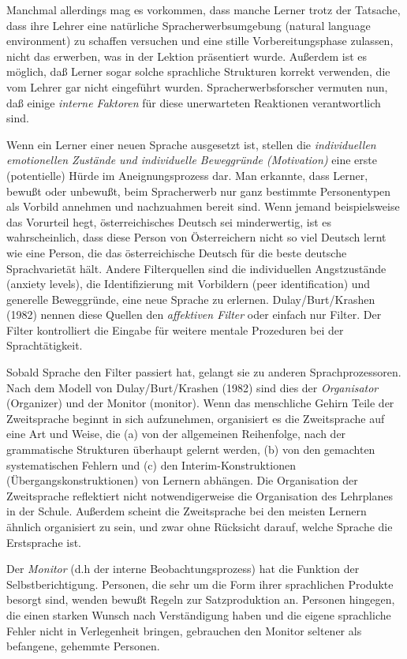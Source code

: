 \documentclass[
  letterpaper,
]{scrbook}
\begin{document}
Manchmal allerdings mag es vorkommen, dass manche Lerner trotz der
Tatsache, dass ihre Lehrer eine natürliche Spracherwerbsumgebung
(natural language environment) zu schaffen versuchen und eine stille
Vorbereitungsphase zulassen, nicht das erwerben, was in der Lektion
präsentiert wurde. Außerdem ist es möglich, daß Lerner sogar solche
sprachliche Strukturen korrekt verwenden, die vom Lehrer gar nicht
eingeführt wurden. Spracherwerbsforscher vermuten nun, daß einige
\emph{interne Faktoren} für diese unerwarteten Reaktionen verantwortlich
sind.

Wenn ein Lerner einer neuen Sprache ausgesetzt ist, stellen die
\emph{individuellen emotionellen Zustände und individuelle Beweggründe
(Motivation)} eine erste (potentielle) Hürde im Aneignungsprozess dar.
Man erkannte, dass Lerner, bewußt oder unbewußt, beim Spracherwerb nur
ganz bestimmte Personentypen als Vorbild annehmen und nachzuahmen bereit
sind. Wenn jemand beispielsweise das Vorurteil hegt, österreichisches
Deutsch sei minderwertig, ist es wahrscheinlich, dass diese Person von
Österreichern nicht so viel Deutsch lernt wie eine Person, die das
österreichische Deutsch für die beste deutsche Sprachvarietät hält.
Andere Filterquellen sind die individuellen Angstzustände (anxiety
levels), die Identifizierung mit Vorbildern (peer identification) und
generelle Beweggründe, eine neue Sprache zu erlernen. Dulay/Burt/Krashen
(1982) nennen diese Quellen den \emph{affektiven Filter} oder einfach
nur Filter. Der Filter kontrolliert die Eingabe für weitere mentale
Prozeduren bei der Sprachtätigkeit.

Sobald Sprache den Filter passiert hat, gelangt sie zu anderen
Sprachprozessoren. Nach dem Modell von Dulay/Burt/Krashen (1982) sind
dies der \emph{Organisator} (Organizer) und der Monitor (monitor). Wenn
das menschliche Gehirn Teile der Zweitsprache beginnt in sich
aufzunehmen, organisiert es die Zweitsprache auf eine Art und Weise, die
(a) von der allgemeinen Reihenfolge, nach der grammatische Strukturen
überhaupt gelernt werden, (b) von den gemachten systematischen Fehlern
und (c) den Interim-Konstruktionen (Übergangskonstruktionen) von Lernern
abhängen. Die Organisation der Zweitsprache reflektiert nicht
notwendigerweise die Organisation des Lehrplanes in der Schule. Außerdem
scheint die Zweitsprache bei den meisten Lernern ähnlich organisiert zu
sein, und zwar ohne Rücksicht darauf, welche Sprache die Erstsprache
ist.

Der \emph{Monitor} (d.h der interne Beobachtungsprozess) hat die
Funktion der Selbstberichtigung. Personen, die sehr um die Form ihrer
sprachlichen Produkte besorgt sind, wenden bewußt Regeln zur
Satzproduktion an. Personen hingegen, die einen starken Wunsch nach
Verständigung haben und die eigene sprachliche Fehler nicht in
Verlegenheit bringen, gebrauchen den Monitor seltener als befangene,
gehemmte Personen.
\end{document}
